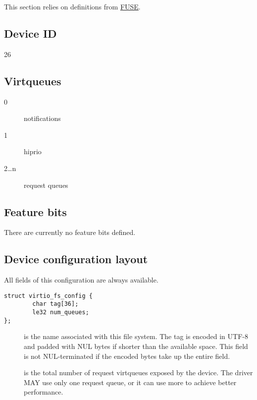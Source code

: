 This section relies on definitions from \hyperref[intro:FUSE]{FUSE}.

\subsection{Device ID}\label{sec:Device Types / File System Device / Device ID}
  26

\subsection{Virtqueues}\label{sec:Device Types / File System Device / Virtqueues}

\begin{description}
\item[0] notifications
\item[1] hiprio
\item[2\ldots n] request queues
\end{description}

\subsection{Feature bits}\label{sec:Device Types / File System Device / Feature bits}

There are currently no feature bits defined.

\subsection{Device configuration layout}\label{sec:Device Types / File System Device / Device configuration layout}

All fields of this configuration are always available.

\begin{lstlisting}
struct virtio_fs_config {
        char tag[36];
        le32 num_queues;
};
\end{lstlisting}

\begin{description}
\item[] is the name associated with this file system.  The tag is
    encoded in UTF-8 and padded with NUL bytes if shorter than the
    available space.  This field is not NUL-terminated if the encoded bytes
    take up the entire field.
\item[] is the total number of request virtqueues exposed by
    the device. The driver MAY use only one request queue,
    or it can use more to achieve better performance.
\end{description}

